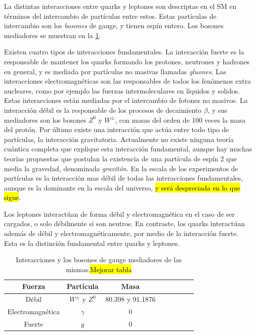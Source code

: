 La distintas interacciones entre quarks y leptones son descriptas en el SM en términos del
intercambio de partículas entre estos. Estas partículas de intercambio son
los \emph{bosones} de gauge, y tienen espín entero.
Los bosones mediadores se muestran en la \cref{tab:bosons}.

Existen cuatro tipos de interacciones fundamentales. La interacción fuerte es la
responsable de mantener los quarks formando los protones, neutrones y hadrones en general, y es
mediada por partículas no masivas llamadas \emph{gluones}. Las interacciones
electromagnéticas son las responsables de todos los fenómenos extra nucleares,
como por ejemplo las fuerzas intermoleculares en líquidos y solidos. Estas
interacciones están mediadas por el intercambio de fotones no masivos. La
interacción débil es la responsable de los procesos de decaimiento $\beta$, y
sus mediadores son los bosones $Z^0$ y $W^\pm$, con masas del orden de 100 veces
la masa del protón. Por último existe una interacción que actúa entre todo tipo
de partículas, la interacción gravitatoria. Actualmente no existe ninguna teoría
cuántica completa que explique esta interacción fundamental, aunque hay muchas
teorías propuestas que postulan la existencia de una partícula de espín 2 que
media la gravedad, denominada \emph{gravitón}. En la escala de los experimentos
de partículas es la interacción mas débil de todas las interacciones
fundamentales, aunque es la dominante en la escala del universo, \hl{y será despreciada
en lo que sigue}.

Los leptones interactúan de forma débil y electromagnética en el caso de ser
cargados, o solo débilmente si son neutros. En contraste, los quarks
interactúan además de débil y electromagnéticamente, por medio de la
interacción fuerte. Esta es la distinción fundamental entre quarks y leptones.


\begin{table}[!ht]
  \centering
  \begin{tabular}{cccccccc}
    \hline
    Fuerza & Partícula & Masa \\
    \hline
    Débil    &   $W^\pm$ y $Z^0$ & 80.398 y 91.1876  \\ %
    \hline
    Electromagnética & $\gamma$ & 0 \\
    \hline
    Fuerte & $g$ & 0\\
    \hline
  \end{tabular}


  \caption{Interacciones y los bosones de gauge mediadores de las mismas.\hl{Mejorar tabla}}
  \label{tab:bosons}
\end{table}


